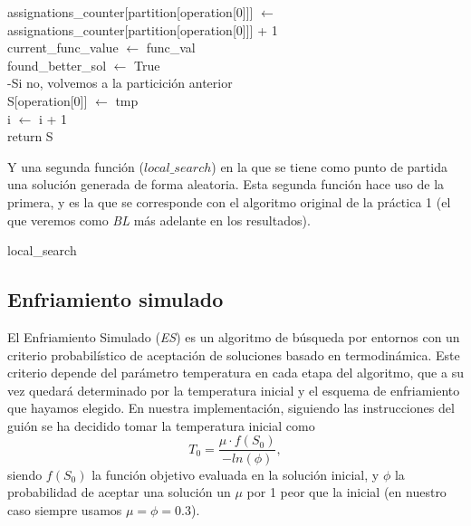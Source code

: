 \documentclass[11pt,a4paper]{article}
\begin{document}
\begin{algorithm}
{{{{                        assignations\_counter[partition[operation[0]]] $\leftarrow$ assignations\_counter[partition[operation[0]]] + 1 \\
                        current\_func\_value $\leftarrow$ func\_val \\
                        found\_better\_sol $\leftarrow$ True \\
                    }
                    {
                    -Si no, volvemos a la particición anterior \\
                        S[operation[0]] $\leftarrow$ tmp  \\
                    }
                    i $\leftarrow$ i + 1 \\
	 	        }
	 	    }
	 		return S \\
	 	}
	\end{algorithm}
	Y una segunda función ($local\_search$) en la que se tiene como punto de partida una solución generada de forma aleatoria. Esta segunda función hace uso de la primera, y es la que se corresponde con el algoritmo original de la práctica 1 (el que veremos como \textit{BL} más adelante en los resultados). 
	\begin{algorithm}
	 	\caption{local\_search} \label{algo:BL}
	\end{algorithm}
	
	\subsection{Enfriamiento simulado}
	El Enfriamiento Simulado (\textit{ES}) es un algoritmo de búsqueda por entornos con un criterio probabilístico de aceptación de soluciones basado en termodinámica. Este criterio depende del parámetro temperatura en cada etapa del algoritmo, que a su vez quedará determinado por la temperatura inicial y el esquema de enfriamiento que hayamos elegido. En nuestra implementación, siguiendo las instrucciones del guión se ha decidido tomar la temperatura inicial como $$T_0 = \frac{\mu \cdot f(S_0)}{-ln(\phi)},$$
	siendo $f(S_0)$ la función objetivo evaluada en la solución inicial, y $\phi$ la probabilidad de aceptar una solución un $\mu$ por 1 peor que la inicial (en nuestro caso siempre usamos $\mu = \phi = 0.3$). 
	
\end{document}
